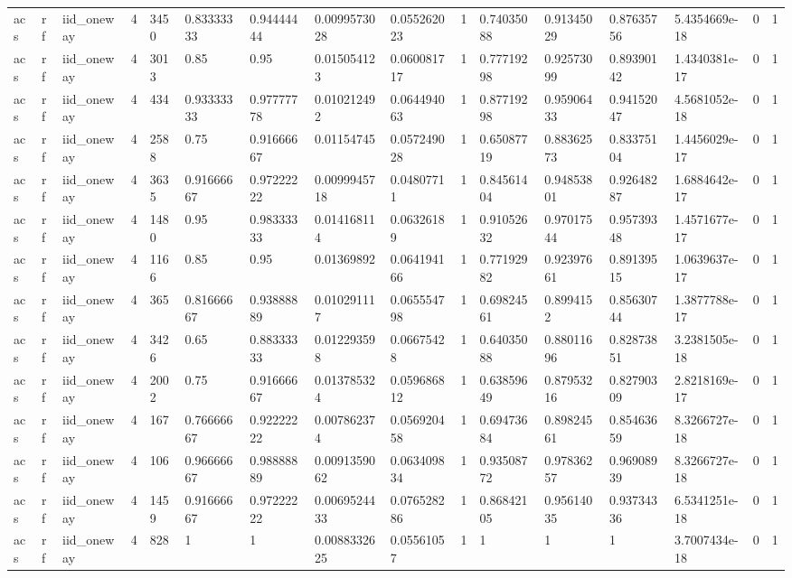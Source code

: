 \begin{tabular}{llllllllllllllll}
acs & rf & iid\_oneway & 4 & 3450 & 0.83333333 & 0.94444444 & 0.0099573028 & 0.055262023 & 1 & 0.74035088 & 0.91345029 & 0.87635756 & 5.4354669e-18 & 0 & 1 \\
acs & rf & iid\_oneway & 4 & 3013 & 0.85 & 0.95 & 0.015054123 & 0.060081717 & 1 & 0.77719298 & 0.92573099 & 0.89390142 & 1.4340381e-17 & 0 & 1 \\
acs & rf & iid\_oneway & 4 & 434 & 0.93333333 & 0.97777778 & 0.010212492 & 0.064494063 & 1 & 0.87719298 & 0.95906433 & 0.94152047 & 4.5681052e-18 & 0 & 1 \\
acs & rf & iid\_oneway & 4 & 2588 & 0.75 & 0.91666667 & 0.01154745 & 0.057249028 & 1 & 0.65087719 & 0.88362573 & 0.83375104 & 1.4456029e-17 & 0 & 1 \\
acs & rf & iid\_oneway & 4 & 3635 & 0.91666667 & 0.97222222 & 0.0099945718 & 0.04807711 & 1 & 0.84561404 & 0.94853801 & 0.92648287 & 1.6884642e-17 & 0 & 1 \\
acs & rf & iid\_oneway & 4 & 1480 & 0.95 & 0.98333333 & 0.014168114 & 0.06326189 & 1 & 0.91052632 & 0.97017544 & 0.95739348 & 1.4571677e-17 & 0 & 1 \\
acs & rf & iid\_oneway & 4 & 1166 & 0.85 & 0.95 & 0.01369892 & 0.064194166 & 1 & 0.77192982 & 0.92397661 & 0.89139515 & 1.0639637e-17 & 0 & 1 \\
acs & rf & iid\_oneway & 4 & 365 & 0.81666667 & 0.93888889 & 0.010291117 & 0.065554798 & 1 & 0.69824561 & 0.8994152 & 0.85630744 & 1.3877788e-17 & 0 & 1 \\
acs & rf & iid\_oneway & 4 & 3426 & 0.65 & 0.88333333 & 0.012293598 & 0.06675428 & 1 & 0.64035088 & 0.88011696 & 0.82873851 & 3.2381505e-18 & 0 & 1 \\
acs & rf & iid\_oneway & 4 & 2002 & 0.75 & 0.91666667 & 0.013785324 & 0.059686812 & 1 & 0.63859649 & 0.87953216 & 0.82790309 & 2.8218169e-17 & 0 & 1 \\
acs & rf & iid\_oneway & 4 & 167 & 0.76666667 & 0.92222222 & 0.007862374 & 0.056920458 & 1 & 0.69473684 & 0.89824561 & 0.85463659 & 8.3266727e-18 & 0 & 1 \\
acs & rf & iid\_oneway & 4 & 106 & 0.96666667 & 0.98888889 & 0.0091359062 & 0.063409834 & 1 & 0.93508772 & 0.97836257 & 0.96908939 & 8.3266727e-18 & 0 & 1 \\
acs & rf & iid\_oneway & 4 & 1459 & 0.91666667 & 0.97222222 & 0.0069524433 & 0.076528286 & 1 & 0.86842105 & 0.95614035 & 0.93734336 & 6.5341251e-18 & 0 & 1 \\
acs & rf & iid\_oneway & 4 & 828 & 1 & 1 & 0.0088332625 & 0.05561057 & 1 & 1 & 1 & 1 & 3.7007434e-18 & 0 & 1 \\

\end{tabular}
